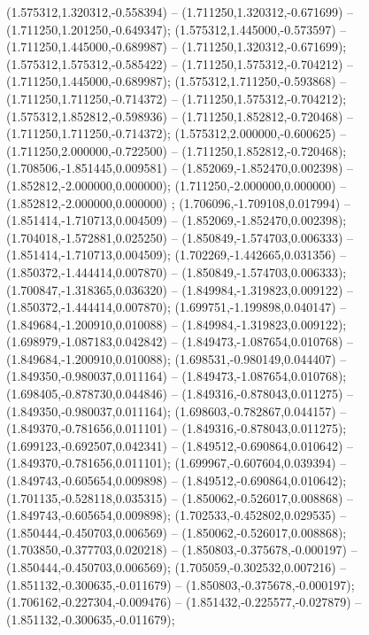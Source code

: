  (1.575312,1.320312,-0.558394) -- (1.711250,1.320312,-0.671699) -- (1.711250,1.201250,-0.649347);
 (1.575312,1.445000,-0.573597) -- (1.711250,1.445000,-0.689987) -- (1.711250,1.320312,-0.671699);
 (1.575312,1.575312,-0.585422) -- (1.711250,1.575312,-0.704212) -- (1.711250,1.445000,-0.689987);
 (1.575312,1.711250,-0.593868) -- (1.711250,1.711250,-0.714372) -- (1.711250,1.575312,-0.704212);
 (1.575312,1.852812,-0.598936) -- (1.711250,1.852812,-0.720468) -- (1.711250,1.711250,-0.714372);
 (1.575312,2.000000,-0.600625) -- (1.711250,2.000000,-0.722500) -- (1.711250,1.852812,-0.720468);
 (1.708506,-1.851445,0.009581) -- (1.852069,-1.852470,0.002398) -- (1.852812,-2.000000,0.000000);
 (1.711250,-2.000000,0.000000) -- (1.852812,-2.000000,0.000000) ;
 (1.706096,-1.709108,0.017994) -- (1.851414,-1.710713,0.004509) -- (1.852069,-1.852470,0.002398);
 (1.704018,-1.572881,0.025250) -- (1.850849,-1.574703,0.006333) -- (1.851414,-1.710713,0.004509);
 (1.702269,-1.442665,0.031356) -- (1.850372,-1.444414,0.007870) -- (1.850849,-1.574703,0.006333);
 (1.700847,-1.318365,0.036320) -- (1.849984,-1.319823,0.009122) -- (1.850372,-1.444414,0.007870);
 (1.699751,-1.199898,0.040147) -- (1.849684,-1.200910,0.010088) -- (1.849984,-1.319823,0.009122);
 (1.698979,-1.087183,0.042842) -- (1.849473,-1.087654,0.010768) -- (1.849684,-1.200910,0.010088);
 (1.698531,-0.980149,0.044407) -- (1.849350,-0.980037,0.011164) -- (1.849473,-1.087654,0.010768);
 (1.698405,-0.878730,0.044846) -- (1.849316,-0.878043,0.011275) -- (1.849350,-0.980037,0.011164);
 (1.698603,-0.782867,0.044157) -- (1.849370,-0.781656,0.011101) -- (1.849316,-0.878043,0.011275);
 (1.699123,-0.692507,0.042341) -- (1.849512,-0.690864,0.010642) -- (1.849370,-0.781656,0.011101);
 (1.699967,-0.607604,0.039394) -- (1.849743,-0.605654,0.009898) -- (1.849512,-0.690864,0.010642);
 (1.701135,-0.528118,0.035315) -- (1.850062,-0.526017,0.008868) -- (1.849743,-0.605654,0.009898);
 (1.702533,-0.452802,0.029535) -- (1.850444,-0.450703,0.006569) -- (1.850062,-0.526017,0.008868);
 (1.703850,-0.377703,0.020218) -- (1.850803,-0.375678,-0.000197) -- (1.850444,-0.450703,0.006569);
 (1.705059,-0.302532,0.007216) -- (1.851132,-0.300635,-0.011679) -- (1.850803,-0.375678,-0.000197);
 (1.706162,-0.227304,-0.009476) -- (1.851432,-0.225577,-0.027879) -- (1.851132,-0.300635,-0.011679);
